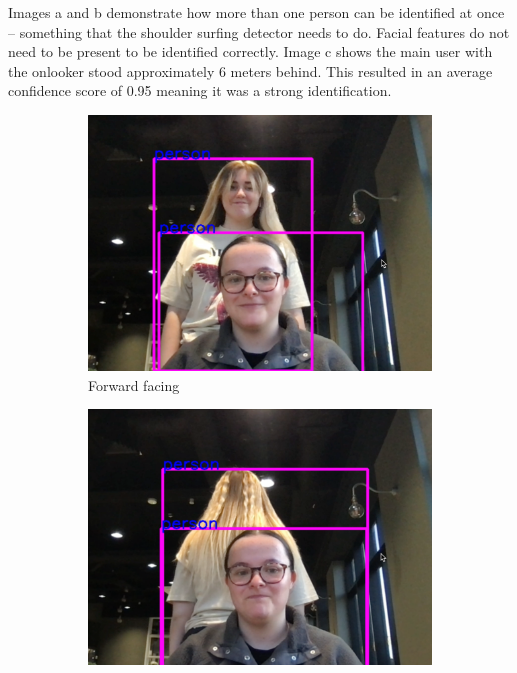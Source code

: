 \documentclass[12pt]{article}
\theoremstyle{plain}
\theoremstyle{definition}
\begin{document}
Images a and b demonstrate how more than one person can be identified at once – something that the shoulder surfing detector needs to do. Facial features do not need to be present to be identified correctly. Image c shows the main user with the onlooker stood approximately 6 meters behind. This resulted in an average confidence score of 0.95 meaning it was a strong identification.


\begin{figure}
     \centering
     \begin{subfigure}[b]{0.3\textwidth}
         \centering
         \includegraphics[width=\textwidth]{img/fig1-img1.png}
         \caption{Forward facing}
         \label{fig:a}
     \end{subfigure}
     \hfill
     \begin{subfigure}[b]{0.3\textwidth}
         \centering
         \includegraphics[width=\textwidth]{img/fig1-img2.png}

\end{subfigure}
\end{figure}
\end{document}
